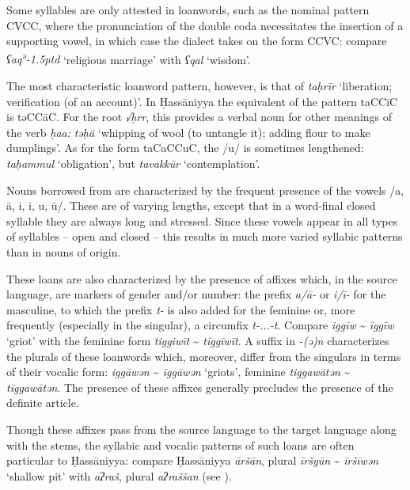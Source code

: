 \documentclass[output=paper]{langsci/langscibook}
\begin{document}
Some syllables are only attested in {loanwords}, such as the nominal pattern CVCC, where the pronunciation of the double {coda} necessitates the insertion of a supporting vowel, in which case the dialect takes on the form CCVC: compare \textit{ʕaq\kern 0.5pt\textsuperscript{ə}\kern -1.5ptd} ‘religious marriage’ with \textit{ʕqal} ‘wisdom’.

The most characteristic {loanword} pattern, however, is that of \textit{taḥrīr} ‘liberation; verification (of an account)’. In Ḥassāniyya the equivalent of the pattern taCCīC is təCCāC. For the {root} \textit{√ḥrr}, this provides a verbal noun for other meanings of the verb \textit{ḥa{\R}{\R}a{\R}:} \textit{təḥ{\R}ā{\R}} ‘whipping of wool (to untangle it); adding flour to make dumplings’. As for the form taCaCCuC, the /u/ is sometimes lengthened: \textit{taḥammul} ‘obligation’, but \textit{tavakkūr} ‘contemplation’.


Nouns borrowed from  are characterized by the frequent presence of the vowels /a, ā, i, ī, u, ū/. These are of varying lengths, except that in a word-final closed syllable they are always long and stressed. Since these vowels appear in all types of syllables – open and closed – this results in much more varied syllabic patterns than in nouns of  origin. 

These loans are also characterized by the presence of affixes which, in the {source language}, are markers of {gender} and/or number: the prefix \textit{a/ā-} or \textit{i/ī-} for the masculine, to which the prefix \textit{t-} is also added for the feminine or, more frequently (especially in the singular), a circumfix \textit{t-...-t}. Compare \textit{iggīw} \~{} \textit{īggīw} ‘griot’ with the feminine form \textit{tiggiwīt} \~{} \textit{tīggīwīt}. A suffix in \textit{-(ə)n} characterizes the plurals of these {loanwords} which, moreover, differ from the singulars in terms of their vocalic form: \textit{iggāwən} \~{} \textit{īggāwən} ‘griots’, feminine \textit{tiggawātən} \~{} \textit{tīggawātən}. The presence of these affixes generally precludes the presence of the {definite} {article}.

Though these affixes pass from the {source language} to the target language along with the stems, the syllabic and vocalic patterns of such loans are often particular to Ḥassāniyya: compare Ḥassāniyya \textit{āršān}, plural \textit{īršyūn} \~{} \textit{īršīwən} ‘shallow pit’ with  \textit{aʔraš}, plural \textit{aʔraššan} (see \citealt{Taine-Cheikh1997Zenaga}).
\end{document}
